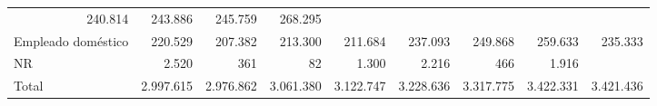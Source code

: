 \begin{tabular}{lllllllll}
  \multicolumn{1}{r}{240.814} &
  \multicolumn{1}{r}{243.886} &
  \multicolumn{1}{r}{245.759} &
  \multicolumn{1}{r}{268.295} \\
\multicolumn{1}{l}{\hspace{1em}Empleado doméstico} &
  \multicolumn{1}{|r}{220.529} &
  \multicolumn{1}{r}{207.382} &
  \multicolumn{1}{r}{213.300} &
  \multicolumn{1}{r}{211.684} &
  \multicolumn{1}{r}{237.093} &
  \multicolumn{1}{r}{249.868} &
  \multicolumn{1}{r}{259.633} &
  \multicolumn{1}{r}{235.333} \\
\multicolumn{1}{l}{\hspace{1em}NR} &
  \multicolumn{1}{|r}{2.520} &
  \multicolumn{1}{r}{361} &
  \multicolumn{1}{r}{82} &
  \multicolumn{1}{r}{1.300} &
  \multicolumn{1}{r}{2.216} &
  \multicolumn{1}{r}{466} &
  \multicolumn{1}{r}{1.916} &
  \multicolumn{1}{r}{} \\
\multicolumn{1}{l}{\hspace{1em}Total} &
  \multicolumn{1}{|r}{2.997.615} &
  \multicolumn{1}{r}{2.976.862} &
  \multicolumn{1}{r}{3.061.380} &
  \multicolumn{1}{r}{3.122.747} &
  \multicolumn{1}{r}{3.228.636} &
  \multicolumn{1}{r}{3.317.775} &
  \multicolumn{1}{r}{3.422.331} &
  \multicolumn{1}{r}{3.421.436} \\
\cline{1-9}
\end{tabular}
